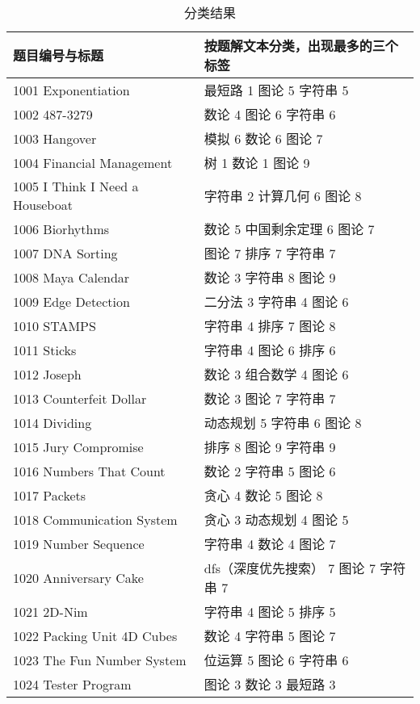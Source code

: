 \begin{longtable}{| p{} | p{} |} 
\caption{分类结果} \\
\hline
 题目编号与标题 & 按题解文本分类，出现最多的三个标签\\ \hline
 1001 Exponentiation  & 最短路 1 图论 5 字符串 5 \\ \hline
 1002 487-3279  & 数论 4 图论 6 字符串 6 \\ \hline
 1003 Hangover  & 模拟 6 数论 6 图论 7 \\ \hline
 1004 Financial Management  & 树 1 数论 1 图论 9 \\ \hline
 1005 I Think I Need a Houseboat  & 字符串 2 计算几何 6 图论 8 \\ \hline
 1006 Biorhythms  & 数论 5 中国剩余定理 6 图论 7 \\ \hline
 1007 DNA Sorting  & 图论 7 排序 7 字符串 7 \\ \hline
 1008 Maya Calendar  & 数论 3 字符串 8 图论 9 \\ \hline
 1009 Edge Detection  & 二分法 3 字符串 4 图论 6 \\ \hline
 1010 STAMPS  & 字符串 4 排序 7 图论 8 \\ \hline
 1011 Sticks  & 字符串 4 图论 6 排序 6 \\ \hline
 1012 Joseph  & 数论 3 组合数学 4 图论 6 \\ \hline
 1013 Counterfeit Dollar  & 数论 3 图论 7 字符串 7 \\ \hline
 1014 Dividing  & 动态规划 5 字符串 6 图论 8 \\ \hline
 1015 Jury Compromise  & 排序 8 图论 9 字符串 9 \\ \hline
 1016 Numbers That Count  & 数论 2 字符串 5 图论 6 \\ \hline
 1017 Packets  & 贪心 4 数论 5 图论 8 \\ \hline
 1018 Communication System  & 贪心 3 动态规划 4 图论 5 \\ \hline
 1019 Number Sequence  & 字符串 4 数论 4 图论 7 \\ \hline
 1020 Anniversary Cake  & dfs（深度优先搜索） 7 图论 7 字符串 7 \\ \hline
 1021 2D-Nim  & 字符串 4 图论 5 排序 5 \\ \hline
 1022 Packing Unit 4D Cubes  & 数论 4 字符串 5 图论 7 \\ \hline
 1023 The Fun Number System  & 位运算 5 图论 6 字符串 6 \\ \hline
 1024 Tester Program  & 图论 3 数论 3 最短路 3 \\ \hline

\end{longtable}
